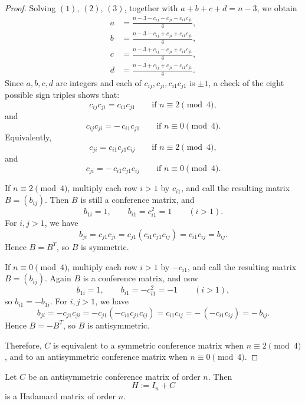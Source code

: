 \documentclass[11pt, a4paper]{ctexrep}
\begin{document}
\begin{proof}
    Solving \((1)\), \((2)\), \((3)\), together with \(a+b+c+d=n-3\), we obtain
    \[
        \begin{aligned}
            a & =\frac{n-3-c_{ij}-c_{ji}-c_{i1}c_{j1}}{4}, \\
            b & =\frac{n-3-c_{ij}+c_{ji}+c_{i1}c_{j1}}{4}, \\
            c & =\frac{n-3+c_{ij}-c_{ji}+c_{i1}c_{j1}}{4}, \\
            d & =\frac{n-3+c_{ij}+c_{ji}-c_{i1}c_{j1}}{4}.
        \end{aligned}
    \]
    Since \(a,b,c,d\) are integers and each of \(c_{ij},c_{ji},c_{i1}c_{j1}\) is \(\pm1\),
    a check of the eight possible sign triples shows that:
    \[
        c_{ij}c_{ji}=c_{i1}c_{j1}\qquad\text{if }n\equiv 2\pmod 4,
    \]
    and
    \[
        c_{ij}c_{ji}=-\,c_{i1}c_{j1}\qquad\text{if }n\equiv 0\pmod 4.
    \]
    Equivalently,
    \[
        c_{ji}=c_{i1}c_{j1}c_{ij}\qquad\text{if }n\equiv 2\pmod 4,
    \]
    and
    \[
        c_{ji}=-\,c_{i1}c_{j1}c_{ij}\qquad\text{if }n\equiv 0\pmod 4.
    \]

    \medskip
    If \(n\equiv 2\pmod 4\), multiply each row \(i>1\) by \(c_{i1}\), and call the resulting matrix \(B=(b_{ij})\).
    Then \(B\) is still a conference matrix, and
    \[
        b_{1i}=1,\qquad b_{i1}=c_{i1}^2=1 \qquad (i>1).
    \]
    For \(i,j>1\), we have
    \[
        b_{ji}=c_{j1}c_{ji}=c_{j1}(c_{i1}c_{j1}c_{ij})=c_{i1}c_{ij}=b_{ij}.
    \]
    Hence \(B=B^T\), so \(B\) is symmetric.

    If \(n\equiv 0\pmod 4\), multiply each row \(i>1\) by \(-c_{i1}\), and call the resulting matrix \(B=(b_{ij})\).
    Again \(B\) is a conference matrix, and now
    \[
        b_{1i}=1,\qquad b_{i1}=-c_{i1}^2=-1 \qquad (i>1),
    \]
    so \(b_{i1}=-b_{1i}\).
    For \(i,j>1\), we have
    \[
        b_{ji}=-c_{j1}c_{ji}=-c_{j1}(-c_{i1}c_{j1}c_{ij})
        = c_{i1}c_{ij}
        = -\,(-c_{i1}c_{ij})
        = -\,b_{ij}.
    \]
    Hence \(B=-B^T\), so \(B\) is antisymmetric.

    Therefore, \(C\) is equivalent to a symmetric conference matrix when \(n\equiv 2\pmod 4\),
    and to an antisymmetric conference matrix when \(n\equiv 0\pmod 4\).
\end{proof}

\begin{theorem}
    Let $C$ be an antisymmetric conference matrix of order $n$. Then
    \[
        H:=I_n+C
    \]
    is a Hadamard matrix of order $n$.
\end{theorem}
\end{document}

